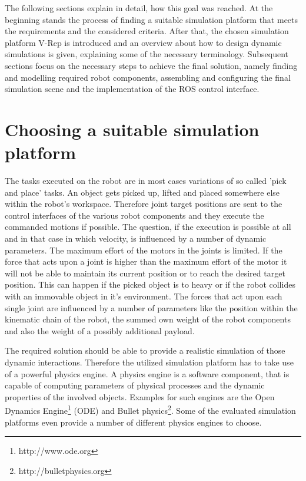 The following sections explain in detail, how this goal was reached. At the beginning stands the process of finding a suitable simulation platform that meets the requirements and the considered criteria. After that, the chosen simulation platform V-Rep is introduced and an overview about how to design dynamic simulations is given, explaining some of the necessary terminology. Subsequent sections focus on the necessary steps to achieve the final solution, namely finding and modelling required robot components, assembling and configuring the final simulation scene and the implementation of the ROS control interface.

\section{Choosing a suitable simulation platform}

The tasks executed on the robot are in most cases variations of so called 'pick and place' tasks. An object gets picked up, lifted and placed somewhere else within the robot's workspace. Therefore joint target positions are sent to the control interfaces of the various robot components and they execute the commanded motions if possible. The question, if the execution is possible at all and in that case in which velocity, is influenced by a number of dynamic parameters. The maximum effort of the motors in the joints is limited. If the force that acts upon a joint is higher than the maximum effort of the motor it will not be able to maintain its current position or to reach the desired target position. This can happen if the picked object is to heavy or if the robot collides with an immovable object in it's environment. The forces that act upon each single joint are influenced by a number of parameters like the position within the kinematic chain of the robot, the summed own weight of the robot components and also the weight of a possibly additional payload.

The required solution should be able to provide a realistic simulation of those dynamic interactions. Therefore the utilized simulation platform has to take use of a powerful physics engine. A physics engine is a software component, that is capable of computing parameters of physical processes and the dynamic properties of the involved objects. Examples for such engines are the Open Dynamics Engine\footnote{http://www.ode.org} (ODE) and Bullet physics\footnote{http://bulletphysics.org}. Some of the evaluated simulation platforms even provide a number of different physics engines to choose.\\

